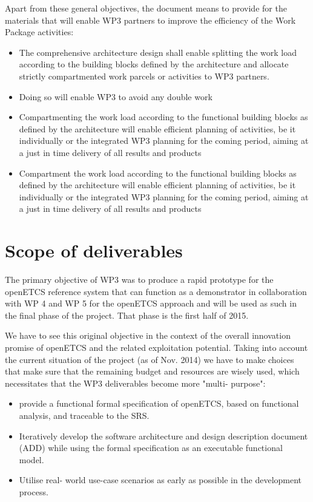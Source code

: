 Apart from these general objectives, the document means to provide for the materials that will enable WP3 partners to improve the efficiency of the Work Package activities:
\begin{itemize}
\item The comprehensive architecture design shall enable splitting the work load according to the building blocks defined by the architecture and allocate strictly compartmented work parcels or activities to WP3 partners.
\item Doing so will enable WP3 to avoid any double work
\item  Compartmenting the work load according to the functional building blocks as defined by the architecture will enable efficient planning of activities, be it individually or the integrated WP3 planning for the coming period, aiming at a just in time delivery of all results and products
\item  Compartment the work load according to the functional building blocks as defined by the architecture will enable efficient planning of activities, be it individually or the integrated WP3 planning for the coming period, aiming at a just in time delivery of all results and products
\end{itemize}



\section{Scope of deliverables}

The primary objective of WP3 was to produce a rapid prototype for the openETCS reference system that can function as a demonstrator in collaboration with WP 4 and WP 5  for the openETCS approach and will be used as such in the final phase of the project. That phase is the first half of 2015.

We have to see this original objective in the context of the overall innovation promise of openETCS and the related exploitation potential.
Taking into account the current situation of the project (as of Nov. 2014) we have to make choices that make sure that the remaining budget and resources are wisely used, which necessitates that the WP3 deliverables become more "multi- purpose":

\begin{itemize}
\item provide a functional formal specification of openETCS, based on functional analysis, and traceable to the SRS.
 
\item Iteratively develop the software architecture and design description document (ADD) while using the formal specification as an executable functional model.
 
\item Utilise real- world use-case scenarios as early as possible in the development process.
\end{itemize}
 
